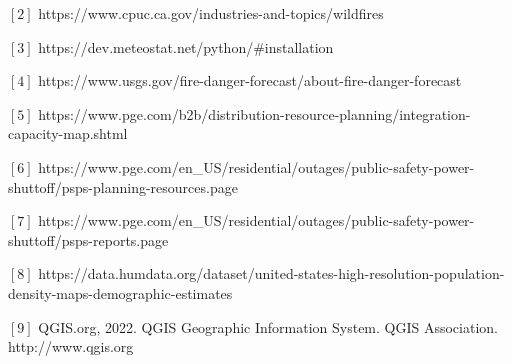 \documentclass{article}
\begin{document}
$[2]$ https://www.cpuc.ca.gov/industries-and-topics/wildfires

$[3]$ https://dev.meteostat.net/python/#installation

$[4]$ https://www.usgs.gov/fire-danger-forecast/about-fire-danger-forecast

$[5]$ https://www.pge.com/b2b/distribution-resource-planning/integration-capacity-map.shtml

$[6]$ https://www.pge.com/en_US/residential/outages/public-safety-power-shuttoff/psps-planning-resources.page

$[7]$ https://www.pge.com/en_US/residential/outages/public-safety-power-shuttoff/psps-reports.page

$[8]$ https://data.humdata.org/dataset/united-states-high-resolution-population-density-maps-demographic-estimates

$[9]$ QGIS.org, 2022. QGIS Geographic Information System. QGIS Association. http://www.qgis.org








\end{document}
